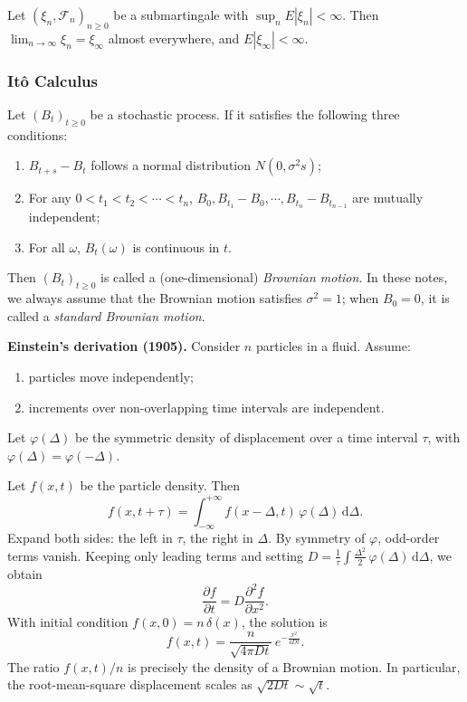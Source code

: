 \begin{thm}
Let $(\xi_n, \mathcal{F}_n)_{n \geq 0}$ be a submartingale with $\sup_n E|\xi_n| < \infty$. Then $\lim_{n \to \infty} \xi_n = \xi_\infty$ almost everywhere, and $E|\xi_\infty| < \infty$.
\end{thm}

\subsubsection{Itô Calculus}
\begin{defn}
Let $(B_t)_{t \geq 0}$ be a stochastic process. If it satisfies the following three conditions:
\begin{enumerate}
    \item $B_{t+s} - B_t$ follows a normal distribution $N(0, \sigma^2 s)$;
    \item For any $0 < t_1 < t_2 < \cdots < t_n$, $B_0, B_{t_1} - B_0, \cdots, B_{t_n} - B_{t_{n-1}}$ are mutually independent;
    \item For all $\omega$, $B_t(\omega)$ is continuous in $t$.
\end{enumerate}
Then $(B_t)_{t \geq 0}$ is called a (one-dimensional) \textit{Brownian motion}. In these notes, we always assume that the Brownian motion satisfies $\sigma^2 = 1$; when $B_0 = 0$, it is called a \textit{standard Brownian motion}.
\end{defn}
\begin{rem}
    \textbf{Einstein's derivation (1905).} Consider $n$ particles in a fluid. Assume: 
    \begin{enumerate}
        \item particles move independently;
        \item increments over non-overlapping time intervals are independent.
    \end{enumerate}
    Let $\varphi(\Delta)$ be the symmetric density of displacement over a time interval $\tau$, with $\varphi(\Delta) = \varphi(-\Delta)$.

Let $f(x,t)$ be the particle density. Then
\[
f(x, t+\tau) = \int_{-\infty}^{+\infty} f(x-\Delta, t)\,\varphi(\Delta)\,\mathrm{d}\Delta.
\]
Expand both sides: the left in $\tau$, the right in $\Delta$. By symmetry of $\varphi$, odd-order terms vanish. Keeping only leading terms and setting $D = \frac{1}{\tau}\int \frac{\Delta^2}{2}\,\varphi(\Delta)\,\mathrm{d}\Delta$, we obtain
\[
\frac{\partial f}{\partial t} = D\frac{\partial^2 f}{\partial x^2}.
\]
With initial condition $f(x,0) = n\,\delta(x)$, the solution is
\[
f(x,t) = \frac{n}{\sqrt{4\pi Dt}}\,e^{-\frac{x^2}{4Dt}}.
\]
The ratio $f(x,t)/n$ is precisely the density of a Brownian motion. In particular, the root-mean-square displacement scales as $\sqrt{2Dt} \sim \sqrt{t}$.
\end{rem}


